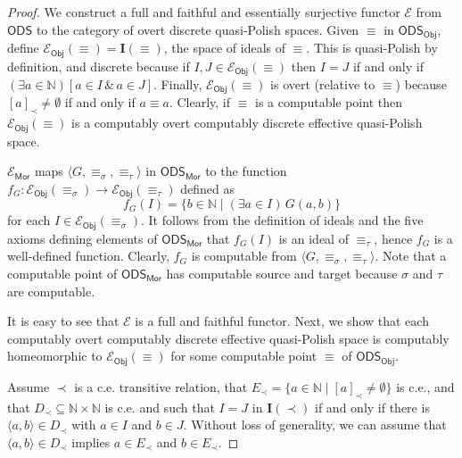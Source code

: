 \documentclass[10pt,a4paper]{amsart}
\def\I#1{{{\mathrm{\mathbf I}}(#1)}}
\def\IN{{\mathbb N}}
\newcommand{\Mor}{\mathsf{Mor}}
\newcommand{\Obj}{\mathsf{Obj}}
\def\calE{{\mathcal{E}}}
\newcommand{\cntSets}{{\mathsf{ODS}}}
\def\src{{\sigma}}
\def\tar{{\tau}}
\begin{document}
\begin{proof}
We construct a full and faithful and essentially surjective functor $\calE$ from $\cntSets$ to the category of overt discrete quasi-Polish spaces. 
Given $\equiv$ in $\cntSets_\Obj$, define $\calE_\Obj(\equiv)=\I{\equiv}$, the space of ideals of $\equiv$.  This is quasi-Polish by definition, and discrete because if $I,J\in \calE_\Obj(\equiv)$ then $I = J$ if and only if $(\exists a\in \IN)[a\in I \,\&\, a\in J]$. Finally, $\calE_\Obj(\equiv)$ is overt (relative to $\equiv$) because $[a]_\prec\not = \emptyset$ if and only if $a\equiv a$. Clearly, if $\equiv$ is a computable point then $\calE_\Obj(\equiv)$ is a computably overt computably discrete effective quasi-Polish space.

$\calE_\Mor$ maps $\langle G, \equiv_\src, \equiv_\tar \rangle$ in $\cntSets_\Mor$ to the function $f_G\colon \calE_\Obj(\equiv_\src)\to \calE_\Obj(\equiv_\tar)$ defined as
\[f_G(I) = \{b\in \IN \mid (\exists a\in I)\, G(a,b)\}\]
for each $I\in \calE_\Obj(\equiv_\src)$. It follows from the definition of ideals and the five axioms defining elements of  $\cntSets_\Mor$ that $f_G(I)$ is an ideal of $\equiv_\tar$, hence $f_G$ is a well-defined function. Clearly, $f_G$ is computable from $\langle G, \equiv_\src, \equiv_\tar \rangle$. Note that a computable point of $\cntSets_\Mor$ has computable source and target because $\src$ and $\tar$ are computable.


It is easy to see that $\calE$ is a full and faithful functor. Next, we show that each computably overt computably discrete effective quasi-Polish space is computably homeomorphic to $\calE_\Obj(\equiv)$ for some computable point $\equiv$ of $\cntSets_\Obj$. 

Assume $\prec$ is a c.e. transitive relation, that $E_\prec=\{ a\in\IN \mid [a]_\prec\not=\emptyset\}$ is c.e., and that $D_\prec \subseteq \IN\times\IN$ is c.e. and such that $I = J$ in $\I{\prec}$ if and only if there is $\langle a,b\rangle\in D_\prec$ with $a \in I$ and $b \in J$. Without loss of generality, we can assume that $\langle a,b\rangle\in D_\prec$ implies $a\in E_\prec$ and $b\in E_\prec$.


\end{proof}
\end{document}
